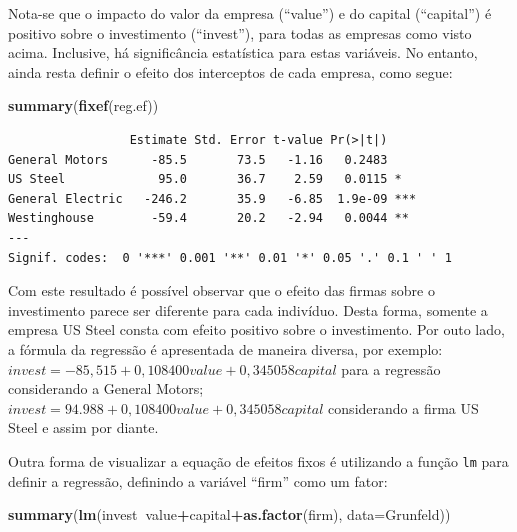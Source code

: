 \documentclass[12pt,brazil,oneside]{book}
\newenvironment{Shaded}{\begin{snugshade}}{\end{snugshade}}
\newcommand{\DataTypeTok}[1]{\textcolor[rgb]{0.13,0.29,0.53}{#1}}
\newcommand{\KeywordTok}[1]{\textcolor[rgb]{0.13,0.29,0.53}{\textbf{#1}}}
\newcommand{\NormalTok}[1]{#1}
\newcommand{\OperatorTok}[1]{\textcolor[rgb]{0.81,0.36,0.00}{\textbf{#1}}}
\begin{document}
Nota-se que o impacto do valor da empresa (``value'') e do capital
(``capital'') é positivo sobre o investimento (``invest''), para todas
as empresas como visto acima. Inclusive, há significância estatística
para estas variáveis. No entanto, ainda resta definir o efeito dos
interceptos de cada empresa, como segue:

\begin{Shaded}
\begin{Highlighting}[]
\KeywordTok{summary}\NormalTok{(}\KeywordTok{fixef}\NormalTok{(reg.ef))}
\end{Highlighting}
\end{Shaded}

\begin{verbatim}
                 Estimate Std. Error t-value Pr(>|t|)    
General Motors      -85.5       73.5   -1.16   0.2483    
US Steel             95.0       36.7    2.59   0.0115 *  
General Electric   -246.2       35.9   -6.85  1.9e-09 ***
Westinghouse        -59.4       20.2   -2.94   0.0044 ** 
---
Signif. codes:  0 '***' 0.001 '**' 0.01 '*' 0.05 '.' 0.1 ' ' 1
\end{verbatim}

Com este resultado é possível observar que o efeito das firmas sobre o
investimento parece ser diferente para cada indivíduo. Desta forma,
somente a empresa US Steel consta com efeito positivo sobre o
investimento. Por outo lado, a fórmula da regressão é apresentada de
maneira diversa, por exemplo:
\(invest = -85,515 + 0,108400value + 0,345058capital\) para a regressão
considerando a General Motors;
\(invest = 94.988 + 0,108400value + 0,345058capital\) considerando a
firma US Steel e assim por diante.

Outra forma de visualizar a equação de efeitos fixos é utilizando a
função \texttt{lm} para definir a regressão, definindo a variável
``firm'' como um fator:

\begin{Shaded}
\begin{Highlighting}[]
\KeywordTok{summary}\NormalTok{(}\KeywordTok{lm}\NormalTok{(invest}\OperatorTok{~}\NormalTok{value}\OperatorTok{+}\NormalTok{capital}\OperatorTok{+}\KeywordTok{as.factor}\NormalTok{(firm), }
           \DataTypeTok{data=}\NormalTok{Grunfeld))}
\end{Highlighting}
\end{Shaded}
\end{document}
